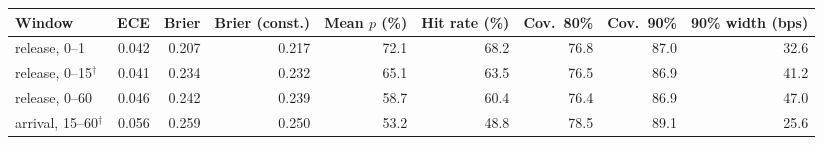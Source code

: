 \begin{tabular}{lrrrrrrrr}
\toprule
Window & ECE & Brier & Brier (const.) & Mean $p$ (\%) & Hit rate (\%) & Cov.\ 80\% & Cov.\ 90\% & 90\% width (bps) \\
\midrule
release, 0--1 & 0.042 & 0.207 & 0.217 & 72.1 & 68.2 & 76.8 & 87.0 & 32.6 \\
release, 0--15$^\dagger$ & 0.041 & 0.234 & 0.232 & 65.1 & 63.5 & 76.5 & 86.9 & 41.2 \\
release, 0--60 & 0.046 & 0.242 & 0.239 & 58.7 & 60.4 & 76.4 & 86.9 & 47.0 \\
arrival, 15--60$^\dagger$ & 0.056 & 0.259 & 0.250 & 53.2 & 48.8 & 78.5 & 89.1 & 25.6 \\
\bottomrule
\end{tabular}
